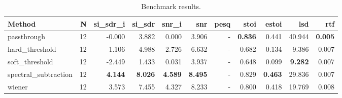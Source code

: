 \begin{table}[t]
\centering
\caption{Benchmark results.}
\label{tab:bench}
\begin{tabular}{lrrrrrrrrrr}
\toprule
Method & N & si\_sdr\_i & si\_sdr & snr\_i & snr & pesq & stoi & estoi & lsd & rtf \\
\midrule
passthrough & 12 & -0.000 & 3.882 & 0.000 & 3.906 & - & \textbf{0.836} & 0.441 & 40.944 & \textbf{0.005} \\
hard_threshold & 12 & 1.106 & 4.988 & 2.726 & 6.632 & - & 0.682 & 0.134 & 9.386 & 0.007 \\
soft_threshold & 12 & -2.449 & 1.433 & 0.031 & 3.937 & - & 0.648 & 0.099 & \textbf{9.282} & 0.007 \\
spectral_subtraction & 12 & \textbf{4.144} & \textbf{8.026} & \textbf{4.589} & \textbf{8.495} & - & 0.829 & \textbf{0.463} & 29.836 & 0.007 \\
wiener & 12 & 3.573 & 7.455 & 4.327 & 8.233 & - & 0.800 & 0.418 & 19.769 & 0.008 \\
\bottomrule
\end{tabular}
\end{table}